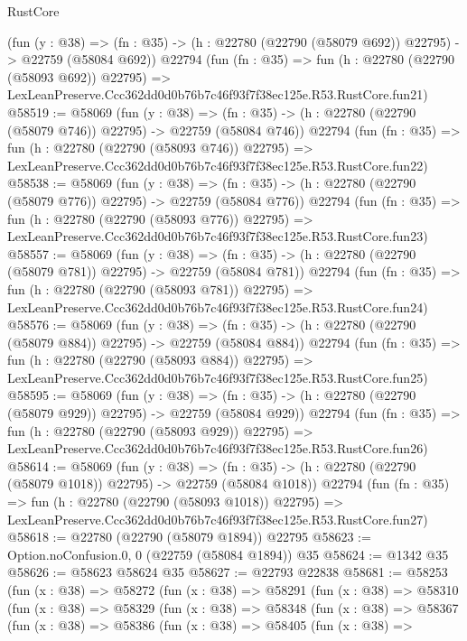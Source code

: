 \begin{lexlean}{RustCore}
\begin{coremodule}
    (fun (y : @38) =>
    (fn : @35) -> (h : @22780 (@22790 (@58079 @692)) @22795) -> @22759 (@58084 @692))
    @22794
    (fun (fn : @35) =>
    fun (h : @22780 (@22790 (@58093 @692)) @22795) =>
    LexLeanPreserve.Ccc362dd0d0b76b7c46f93f7f38ec125e.R53.RustCore.fun21)
@58519 := @58069
    (fun (y : @38) =>
    (fn : @35) -> (h : @22780 (@22790 (@58079 @746)) @22795) -> @22759 (@58084 @746))
    @22794
    (fun (fn : @35) =>
    fun (h : @22780 (@22790 (@58093 @746)) @22795) =>
    LexLeanPreserve.Ccc362dd0d0b76b7c46f93f7f38ec125e.R53.RustCore.fun22)
@58538 := @58069
    (fun (y : @38) =>
    (fn : @35) -> (h : @22780 (@22790 (@58079 @776)) @22795) -> @22759 (@58084 @776))
    @22794
    (fun (fn : @35) =>
    fun (h : @22780 (@22790 (@58093 @776)) @22795) =>
    LexLeanPreserve.Ccc362dd0d0b76b7c46f93f7f38ec125e.R53.RustCore.fun23)
@58557 := @58069
    (fun (y : @38) =>
    (fn : @35) -> (h : @22780 (@22790 (@58079 @781)) @22795) -> @22759 (@58084 @781))
    @22794
    (fun (fn : @35) =>
    fun (h : @22780 (@22790 (@58093 @781)) @22795) =>
    LexLeanPreserve.Ccc362dd0d0b76b7c46f93f7f38ec125e.R53.RustCore.fun24)
@58576 := @58069
    (fun (y : @38) =>
    (fn : @35) -> (h : @22780 (@22790 (@58079 @884)) @22795) -> @22759 (@58084 @884))
    @22794
    (fun (fn : @35) =>
    fun (h : @22780 (@22790 (@58093 @884)) @22795) =>
    LexLeanPreserve.Ccc362dd0d0b76b7c46f93f7f38ec125e.R53.RustCore.fun25)
@58595 := @58069
    (fun (y : @38) =>
    (fn : @35) -> (h : @22780 (@22790 (@58079 @929)) @22795) -> @22759 (@58084 @929))
    @22794
    (fun (fn : @35) =>
    fun (h : @22780 (@22790 (@58093 @929)) @22795) =>
    LexLeanPreserve.Ccc362dd0d0b76b7c46f93f7f38ec125e.R53.RustCore.fun26)
@58614 := @58069
    (fun (y : @38) =>
    (fn : @35) -> (h : @22780 (@22790 (@58079 @1018)) @22795) -> @22759 (@58084 @1018))
    @22794
    (fun (fn : @35) =>
    fun (h : @22780 (@22790 (@58093 @1018)) @22795) =>
    LexLeanPreserve.Ccc362dd0d0b76b7c46f93f7f38ec125e.R53.RustCore.fun27)
@58618 := @22780 (@22790 (@58079 @1894)) @22795
@58623 := Option.noConfusion.{0, 0} (@22759 (@58084 @1894)) @35
@58624 := @1342 @35
@58626 := @58623 @58624 @35
@58627 := @22793 @22838
@58681 := @58253
    (fun (x : @38) =>
    @58272
      (fun (x : @38) =>
      @58291
        (fun (x : @38) =>
        @58310
          (fun (x : @38) =>
          @58329
            (fun (x : @38) =>
            @58348
              (fun (x : @38) =>
              @58367
                (fun (x : @38) =>
                @58386
                  (fun (x : @38) =>
                  @58405
                    (fun (x : @38) =>

\end{coremodule}
\end{lexlean}
